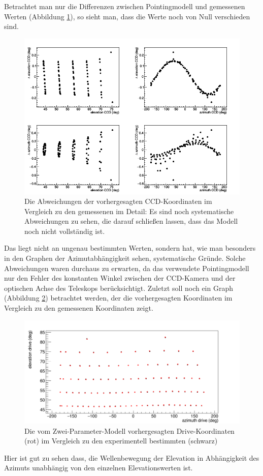 Betrachtet man nur die Differenzen zwischen Pointingmodell und gemessenen Werten (Abbildung \ref{img:C2D}), so sieht man, dass die Werte noch von Null verschieden sind.
\begin{figure}[htbp]
\centering
\includegraphics[width=\textwidth]{../341/C2D.png}
\caption{Die Abweichungen der vorhergesagten CCD-Koordinaten im Vergleich zu den gemessenen im Detail: Es sind noch systematische Abweichungen zu sehen, die darauf schließen lassen, dass das Modell noch nicht vollständig ist.}
\label{img:C2D}
\end{figure}
Das liegt nicht an ungenau bestimmten Werten, sondern hat, wie man besonders in den Graphen der Azimutabhängigkeit sehen, systematische Gründe. Solche Abweichungen waren durchaus zu erwarten, da das verwendete Pointingmodell nur den Fehler des konstanten Winkel zwischen der CCD-Kamera und der optischen Achse des Teleskops berücksichtigt. Zuletzt soll noch ein Graph (Abbildung \ref{img:C2Dcomp2}) betrachtet werden, der die vorhergesagten Koordinaten im Vergleich zu den gemessenen Koordinaten zeigt.
\begin{figure}[htbp]
\centering
\includegraphics[width=\textwidth]{../341/C2Dcomp2.png}
\caption{Die vom Zwei-Parameter-Modell vorhergesagten Drive-Koordinaten (rot) im Vergleich zu den experimentell bestimmten (schwarz)}
\label{img:C2Dcomp2}
\end{figure}
Hier ist gut zu sehen dass, die Wellenbewegung der Elevation in Abhängigkeit des Azimuts unabhängig von den einzelnen Elevationswerten ist.
